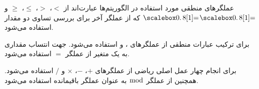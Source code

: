 
عملگرهای منطقی مورد استفاده در الگوریتم‌ها عبارت‌اند از {$<$}، {$>$}، {$\leq$}، {$\geq$} و {$\isequal$} که از عملگر آخر برای بررسی تساوی دو مقدار استفاده می‌شود.

برای ترکیب عبارات منطقی از عملگرهای {}، {} و {} استفاده می‌شود. جهت انتساب مقداری به یک متغیر از عملگر {$=$} استفاده می‌شود.

برای انجام چهار عمل اصلی ریاضی از عملگرهای {$+$}، {$-$}، {$\times$} و {$/$} استفاده می‌شود. همچنین از عملگر {$\bmod$} به عنوان عملگر باقیمانده استفاده می‌شود.